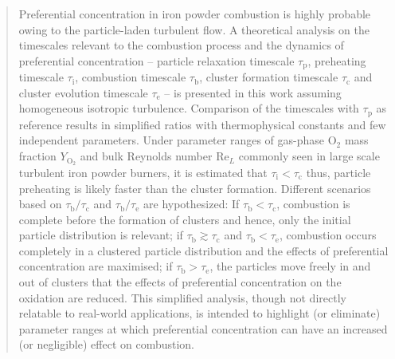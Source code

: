 \documentclass[authoryear,preprint,review,12pt]{elsarticle}
\newcommand{\mrm}[1]{\mathrm{#1}}
\newcommand{\taup}{\tau_\mathrm{p}}
\newcommand{\taui}{\tau_\mathrm{i}}
\newcommand{\taub}{\tau_\mathrm{b}}
\newcommand{\tauc}{\tau_\mathrm{c}}
\newcommand{\taue}{\tau_\mathrm{e}}
\begin{document}
\begin{frontmatter}
\begin{abstract}
Preferential concentration in iron powder combustion is highly probable owing to the particle-laden turbulent flow. A theoretical analysis on the timescales relevant to the combustion process and the dynamics of preferential concentration -- particle relaxation timescale $\taup$, preheating timescale $\taui$, combustion timescale $\taub$, cluster formation timescale $\tauc$ and cluster evolution timescale $\taue$ -- is presented in this work assuming homogeneous isotropic turbulence. Comparison of the timescales with $\taup$ as reference results in simplified ratios with thermophysical constants and few independent parameters. Under parameter ranges of gas-phase $\mathrm{O_2}$ mass fraction $Y_\mrm{O_2}$ and bulk Reynolds number $\mrm{Re}_L$  commonly seen in large scale turbulent iron powder burners, it is estimated that $\taui <\tauc$ thus, particle preheating is likely faster than the cluster formation. Different scenarios based on $\taub/\tauc$ and $\taub/\taue$ are hypothesized: If $\taub < \tauc$, combustion is complete before the formation of clusters and hence, only the initial particle distribution is relevant; if $\taub\gtrsim\tauc$ and $\taub < \taue$, combustion occurs completely in a clustered particle distribution and the effects of preferential concentration are maximised; if $\taub > \taue$, the particles move freely in and out of clusters that the effects of preferential concentration on the oxidation are reduced. This simplified analysis, though not directly relatable to real-world applications, is intended to highlight (or eliminate) parameter ranges at which preferential concentration can have an increased (or negligible) effect on combustion. 

\end{abstract}
\end{frontmatter}
\end{document}
